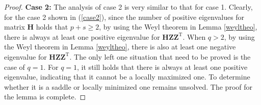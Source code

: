 \begin{proof}
 
 \textbf{Case 2:}
The analysis of case  2  is very similar to that for case 1.  
 Clearly, for  the  case 2  shown  in  (\ref{case2}), 
 since the  number  of    positive  eigenvalues   for  matrix $
 \mathbf H
 $
 holds  that 
 $ p+s \ge 2$,
 by  using the Weyl  theorem  in  Lemma  \ref{weyltheo},  
 there is always  at  least  one  positive  eigenvalue
 for 
 $
 \mathbf H
 \mathbf Z
 \mathbf Z^{\mathrm T} 
 $.
When 
$q > 2$, 
by  using the Weyl  theorem  in  Lemma  \ref{weyltheo},  
there is also  at  least  one  negative  eigenvalue
for 
$
\mathbf H
\mathbf Z
\mathbf Z^{\mathrm T} 
$.
The  only  left   one  situation  that  need to be  proved  is  
the  case  of 
$ q=1$. 
For $ q=1$,  it still holds that 
 there is always  at  least  one  positive  eigenvalue, indicating 
 that it cannot be a locally maximized one. 
 To determine whether it is a  saddle or locally minimized one remains unsolved. 
  The proof  for the lemma  is  complete.
 
\end{proof}


